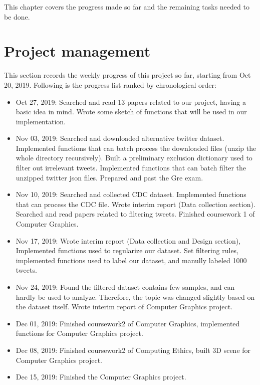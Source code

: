 This chapter covers the progress made so far and the remaining tasks needed to be done.
\section{Project management}
This section records the weekly progress of this project so far, starting from Oct 20, 2019. Following is the progress list ranked by chronological order:
\begin{itemize}
    \item Oct 27, 2019: Searched and read 13 papers related to our project, having a basic idea in mind. Wrote some sketch of functions that will be used in our implementation.
    \item Nov 03, 2019: Searched and downloaded alternative twitter dataset. Implemented functions that can batch process the downloaded files (unzip the whole directory recursively). Built a preliminary exclusion dictionary used to filter out irrelevant tweets. Implemented functions that can batch filter the unzipped twitter json files. Prepared and past the Gre exam. 
    \item Nov 10, 2019: Searched and collected CDC dataset. Implemented functions that can process the CDC file. Wrote interim report (Data collection section). Searched and read papers related to filtering tweets. Finished coursework 1 of Computer Graphics.
    \item Nov 17, 2019: Wrote interim report (Data collection and Design section), Implemented functions used to regularize our dataset. Set filtering rules, implemented functions used to label our dataset, and manully labeled 1000 tweets.
    \item Nov 24, 2019: Found the filtered dataset contains few samples, and can hardly be used to analyze. Therefore, the topic was changed slightly based on the dataset itself. Wrote interim report of Computer Graphics project.
    \item Dec 01, 2019: Finished coursework2 of Computer Graphics, implemented functions for Computer Graphics project.
    \item Dec 08, 2019: Finished coursework2 of Computing Ethics, built 3D scene for Computer Graphics project.
    \item Dec 15, 2019: Finished the Computer Graphics project.
\end{itemize} 

